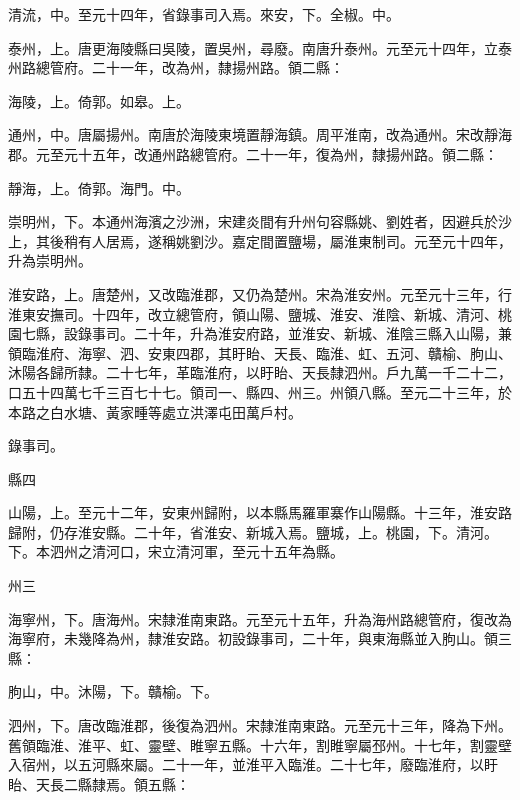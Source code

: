 \begin{pinyinscope}
 清流，中。至元十四年，省錄事司入焉。來安，下。全椒。中。



 泰州，上。唐更海陵縣曰吳陵，置吳州，尋廢。南唐升泰州。元至元十四年，立泰州路總管府。二十一年，改為州，隸揚州路。領二縣：



 海陵，上。倚郭。如皋。上。



 通州，中。唐屬揚州。南唐於海陵東境置靜海鎮。周平淮南，改為通州。宋改靜海郡。元至元十五年，改通州路總管府。二十一年，復為州，隸揚州路。領二縣：



 靜海，上。倚郭。海門。中。



 崇明州，下。本通州海濱之沙洲，宋建炎間有升州句容縣姚、劉姓者，因避兵於沙上，其後稍有人居焉，遂稱姚劉沙。嘉定間置鹽場，屬淮東制司。元至元十四年，升為崇明州。



 淮安路，上。唐楚州，又改臨淮郡，又仍為楚州。宋為淮安州。元至元十三年，行淮東安撫司。十四年，改立總管府，領山陽、鹽城、淮安、淮陰、新城、清河、桃園七縣，設錄事司。二十年，升為淮安府路，並淮安、新城、淮陰三縣入山陽，兼領臨淮府、海寧、泗、安東四郡，其盱眙、天長、臨淮、虹、五河、贛榆、朐山、沐陽各歸所隸。二十七年，革臨淮府，以盱眙、天長隸泗州。戶九萬一千二十二，口五十四萬七千三百七十七。領司一、縣四、州三。州領八縣。至元二十三年，於本路之白水塘、黃家畽等處立洪澤屯田萬戶村。



 錄事司。



 縣四



 山陽，上。至元十二年，安東州歸附，以本縣馬羅軍寨作山陽縣。十三年，淮安路歸附，仍存淮安縣。二十年，省淮安、新城入焉。鹽城，上。桃園，下。清河。下。本泗州之清河口，宋立清河軍，至元十五年為縣。



 州三



 海寧州，下。唐海州。宋隸淮南東路。元至元十五年，升為海州路總管府，復改為海寧府，未幾降為州，隸淮安路。初設錄事司，二十年，與東海縣並入朐山。領三縣：



 朐山，中。沐陽，下。贛榆。下。



 泗州，下。唐改臨淮郡，後復為泗州。宋隸淮南東路。元至元十三年，降為下州。舊領臨淮、淮平、虹、靈壁、睢寧五縣。十六年，割睢寧屬邳州。十七年，割靈壁入宿州，以五河縣來屬。二十一年，並淮平入臨淮。二十七年，廢臨淮府，以盱眙、天長二縣隸焉。領五縣：




\end{pinyinscope}

